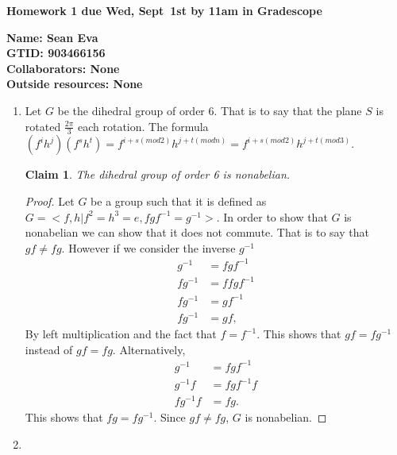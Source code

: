 \documentclass{article}
\newtheorem{ishaan}{Claim}[section]
\begin{document}
{\noindent\Large\textbf{Homework 1 due Wed, Sept~1st by 11am in Gradescope}}

\vspace{.25in}

{\large
\noindent
\textbf{Name: Sean Eva} \smallskip \\
\textbf{GTID: 903466156} \smallskip \\
\textbf{Collaborators: None} \smallskip \\
\textbf{Outside resources: None} \smallskip
}

\pagebreak 

\begin{enumerate}
    \item 
    
    Let $G$ be the dihedral group of order $6$. That is to say that the plane $S$ is rotated $\frac{2\pi}{3}$ each rotation. The formula $(f^ih^j)(f^sh^t)=f^{i+s(mod 2)}h^{j+t(mod n)}=f^{i+s(mod 2)}h^{j+t(mod 3)}$.
    \begin{ishaan}
    The dihedral group of order 6 is nonabelian.
    \end{ishaan}
    \begin{proof}
    Let $G$ be a group such that it is defined as $G=<f, h|f^2=h^3=e,fgf^{-1}=g^{-1}>$. In order to show that $G$ is nonabelian we can show that it does not commute. That is to say that $gf\neq fg$. However if we consider the inverse $g^{-1}$
    \begin{align*}
        g^{-1} &= fgf^{-1}\\
        fg^{-1} &= ffgf^{-1}\\
        fg^{-1} &= gf^{-1}\\
        fg^{-1} &= gf,
    \end{align*}
    By left multiplication and the fact that $f = f^{-1}$. This shows that $gf=fg^{-1}$ instead of $gf=fg$. Alternatively,
    \begin{align*}
        g^{-1} &= fgf^{-1}\\
        g^{-1}f &= fgf^{-1}f\\
        fg^{-1}f &= fg.
    \end{align*}
     This shows that $fg = fg^{-1}$. Since $gf \neq fg$, $G$ is nonabelian.
    \end{proof}
    \pagebreak 
    
    \item
    

\end{enumerate}
\end{document}
